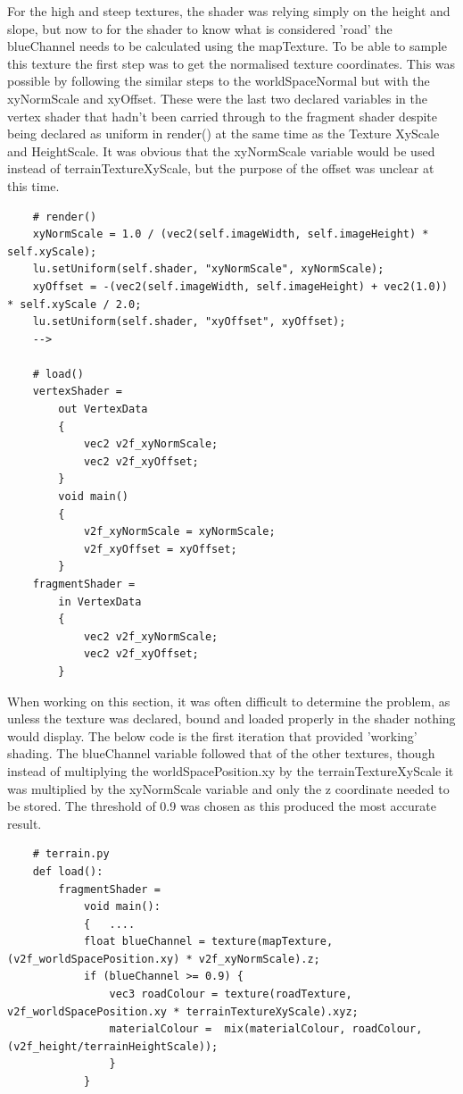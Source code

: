 \documentclass[a4 paper, 12pt]{article}
\begin{document}
For the high and steep textures, the shader was relying simply on the height and slope, but now to for the shader to know what is considered 'road' the blueChannel needs to be calculated using the mapTexture. To be able to sample this texture the first step was to get the normalised texture coordinates. This was possible by following the similar steps to the worldSpaceNormal but with the xyNormScale and xyOffset. These were the last two declared variables in the vertex shader that hadn't been carried through to the fragment shader despite being declared as uniform in render() at the same time as the Texture XyScale and HeightScale. It was obvious that the xyNormScale variable would be used instead of terrainTextureXyScale, but the purpose of the offset was unclear at this time. 
    \begin{lstlisting}
    # render()      
    xyNormScale = 1.0 / (vec2(self.imageWidth, self.imageHeight) * self.xyScale);
    lu.setUniform(self.shader, "xyNormScale", xyNormScale);
    xyOffset = -(vec2(self.imageWidth, self.imageHeight) + vec2(1.0)) * self.xyScale / 2.0;
    lu.setUniform(self.shader, "xyOffset", xyOffset);
    --> 

    # load()
    vertexShader =
        out VertexData
        {
            vec2 v2f_xyNormScale;
            vec2 v2f_xyOffset;
        }
        void main()
        {
            v2f_xyNormScale = xyNormScale;
            v2f_xyOffset = xyOffset;
        }
    fragmentShader = 
        in VertexData
        {
            vec2 v2f_xyNormScale;
            vec2 v2f_xyOffset;
        }
        \end{lstlisting}

When working on this section, it was often difficult to determine the problem, as unless the texture was declared, bound and loaded properly in the shader nothing would display. The below code is the first iteration that provided 'working' shading. The blueChannel variable followed that of the other textures, though instead of multiplying the worldSpacePosition.xy by the terrainTextureXyScale it was multiplied by the xyNormScale variable and only the z coordinate needed to be stored. The threshold of 0.9 was chosen as this produced the most accurate result. 
    \begin{lstlisting}
    # terrain.py       
    def load():
        fragmentShader =                 
            void main():
            {   ....
            float blueChannel = texture(mapTexture, (v2f_worldSpacePosition.xy) * v2f_xyNormScale).z;
            if (blueChannel >= 0.9) {
                vec3 roadColour = texture(roadTexture, v2f_worldSpacePosition.xy * terrainTextureXyScale).xyz;
                materialColour =  mix(materialColour, roadColour, (v2f_height/terrainHeightScale));
                }
            }
    \end{lstlisting} 
\end{document}
